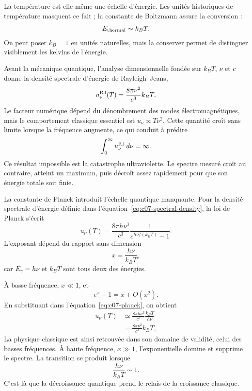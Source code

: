 La température est elle-même une échelle d’énergie. Les unités historiques de température masquent ce fait ; la constante de Boltzmann assure la conversion :
\begin{equation}
E_{\rm thermal}\sim k_B T.
\end{equation}
On peut poser \(k_B=1\) en unités naturelles, mais la conserver permet de distinguer visiblement les kelvins de l’énergie.

Avant la mécanique quantique, l’analyse dimensionnelle fondée sur \(k_BT\), \(\nu\) et \(c\) donne la densité spectrale d’énergie de Rayleigh--Jeans,
\begin{equation}
u_\nu^{\rm RJ}(T)=\frac{8\pi\nu^2}{c^3}k_BT.
\label{eq:c07-rayleigh-jeans}
\end{equation}
Le facteur numérique dépend du dénombrement des modes électromagnétiques, mais le comportement classique essentiel est \(u_\nu\propto T\nu^2\). Cette quantité croît sans limite lorsque la fréquence augmente, ce qui conduit à prédire
\begin{equation}
\int_0^\infty u_\nu^{\rm RJ}\,d\nu=\infty.
\end{equation}
Ce résultat impossible est la catastrophe ultraviolette. Le spectre mesuré croît au contraire, atteint un maximum, puis décroît assez rapidement pour que son énergie totale soit finie.

La constante de Planck introduit l’échelle quantique manquante. Pour la densité spectrale d’énergie définie dans l’équation~\eqref{eq:c07-spectral-density}, la loi de Planck s’écrit
\begin{equation}
u_\nu(T)
=
\frac{8\pi h\nu^3}{c^3}
\frac{1}{e^{h\nu/(k_BT)}-1}.
\label{eq:c07-planck}
\end{equation}
L’exposant dépend du rapport sans dimension
\begin{equation}
x=\frac{h\nu}{k_BT},
\end{equation}
car \(E_\gamma=h\nu\) et \(k_BT\) sont tous deux des énergies.

À basse fréquence, \(x\ll1\), et
\begin{equation}
e^x-1=x+O(x^2).
\end{equation}
En substituant dans l’équation~\eqref{eq:c07-planck}, on obtient
\begin{align}
u_\nu(T)
&\simeq
\frac{8\pi h\nu^3}{c^3}
\frac{k_BT}{h\nu}
\\
&=
\frac{8\pi\nu^2}{c^3}k_BT,
\end{align}
La physique classique est ainsi retrouvée dans son domaine de validité, celui des basses fréquences. À haute fréquence, \(x\gg1\), l’exponentielle domine et supprime le spectre. La transition se produit lorsque
\begin{equation}
\frac{h\nu}{k_BT}\sim1.
\label{eq:c07-crossover}
\end{equation}
C’est là que la décroissance quantique prend le relais de la croissance classique.

